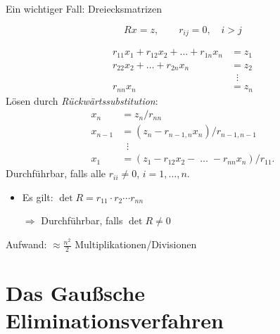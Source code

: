 Ein wichtiger Fall: Dreiecksmatrizen
\begin{center}
\begin{equation*}
Rx = z, \qquad r_{ij} =0, \quad i > j
\end{equation*}
\end{center}
\begin{align*}
 r_{11}x_1 + r_{12}x_2 + \dots + r_{1n}x_n & = z_1 \\
             r_{22}x_2 + \dots + r_{2n}x_n & = z_2 \\
                                           & \;\; \vdots \\
                                r_{nn}x_n  & = z_n
\end{align*}
Lösen durch \emph{Rückwärtssubstitution}:
\begin{align*}
x_n     & = z_n/ r_{nn} \\
x_{n-1} & = (z_n - r_{n-1,n}x_n)/ r_{n-1,n-1} \\
        & \; \; \vdots \\
x_1     & = (z_1 - r_{12}x_2 - \;\dots\; - r_{nn}x_n)/ r_{11}.
\end{align*}
Durchführbar, falls alle $r_{ii} \neq 0$, $i = 1, \dots, n$.
\begin{itemize}
\item Es gilt: $\det R = r_{11} \cdot r_{2} \cdots r_{nn}$
\item[$\Rightarrow$] Durchführbar, falls $\det R \neq 0$
\end{itemize}
Aufwand: $\approx \frac{n^2}{2}$ Multiplikationen/Divisionen

\section{Das Gaußsche Eliminationsverfahren}

